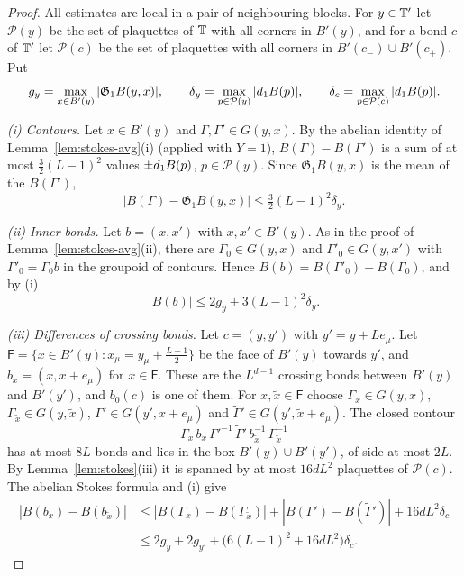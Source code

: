 \begin{proof}
All estimates are local in a pair of neighbouring blocks. For $y\in\mathbb T'$ let $\mathcal P(y)$ be the set of plaquettes of $\mathbb T$ with all corners in $B'(y)$, and for a bond $c$ of $\mathbb T'$ let $\mathcal P(c)$ be the set of plaquettes with all corners in $B'(c_-)\cup B'(c_+)$. Put
\[
g_y=\max_{x\in B'(y)}|\mathfrak G_1B(y,x)|,\qquad\delta_y=\max_{p\in\mathcal P(y)}|d_1 B(p)|,\qquad\delta_c=\max_{p\in\mathcal P(c)}|d_1 B(p)| .
\]

\emph{(i) Contours.} Let $x\in B'(y)$ and $\Gamma,\Gamma'\in G(y,x)$. By the abelian identity of Lemma~\ref{lem:stokes-avg}(i) (applied with $Y=1$), $B(\Gamma)-B(\Gamma')$ is a sum of at most $\frac32(L-1)^2$ values $\pm d_1 B(p)$, $p\in\mathcal P(y)$. Since $\mathfrak G_1B(y,x)$ is the mean of the $B(\Gamma')$,
\[
|B(\Gamma)-\mathfrak G_1B(y,x)|\le\tfrac32(L-1)^2\delta_y .
\]

\emph{(ii) Inner bonds.} Let $b=(x,x')$ with $x,x'\in B'(y)$. As in the proof of Lemma~\ref{lem:stokes-avg}(ii), there are $\Gamma_0\in G(y,x)$ and $\Gamma'_0\in G(y,x')$ with $\Gamma'_0=\Gamma_0b$ in the groupoid of contours. Hence $B(b)=B(\Gamma'_0)-B(\Gamma_0)$, and by (i)
\[
|B(b)|\le2g_y+3(L-1)^2\delta_y .
\]

\emph{(iii) Differences of crossing bonds.} Let $c=(y,y')$ with $y'=y+Le_\mu$. Let $\mathsf F=\{x\in B'(y):x_\mu=y_\mu+\frac{L-1}2\}$ be the face of $B'(y)$ towards $y'$, and $b_x=(x,x+e_\mu)$ for $x\in\mathsf F$. These are the $L^{d-1}$ crossing bonds between $B'(y)$ and $B'(y')$, and $b_0(c)$ is one of them. For $x,\tilde x\in\mathsf F$ choose $\Gamma_x\in G(y,x)$, $\Gamma_{\tilde x}\in G(y,\tilde x)$, $\Gamma'\in G(y',x+e_\mu)$ and $\tilde\Gamma'\in G(y',\tilde x+e_\mu)$. The closed contour
\[
\Gamma_x\,b_x\,\Gamma'^{-1}\,\tilde\Gamma'\,b_{\tilde x}^{-1}\,\Gamma_{\tilde x}^{-1}
\]
has at most $8L$ bonds and lies in the box $B'(y)\cup B'(y')$, of side at most $2L$. By Lemma~\ref{lem:stokes}(iii) it is spanned by at most $16dL^2$ plaquettes of $\mathcal P(c)$. The abelian Stokes formula and (i) give
\[
\begin{aligned}
|B(b_x)-B(b_{\tilde x})|&\le|B(\Gamma_x)-B(\Gamma_{\tilde x})|+|B(\Gamma')-B(\tilde\Gamma')|+16dL^2\delta_c\\
&\le2g_y+2g_{y'}+\big(6(L-1)^2+16dL^2\big)\delta_c .
\end{aligned}
\]


\end{proof}
